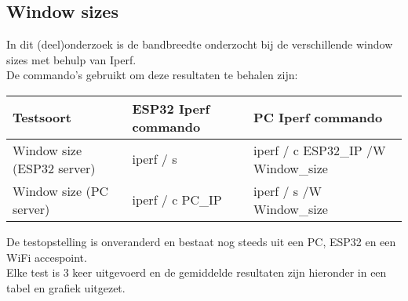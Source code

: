 \documentclass[../DCM2_Verslag.tex]{subfiles}
\begin{document}
 \clearpage
\subsection{Window sizes}
In dit (deel)onderzoek is de bandbreedte onderzocht bij de verschillende window sizes met behulp van Iperf. \\
De commando's gebruikt om deze resultaten te behalen zijn:\\
\begin{center}
\begin{tabular}{||l|l|l|}
   	 Testsoort & ESP32 Iperf commando & PC Iperf commando\\
   	 \hline \hline    
   	 Window size (ESP32 server) & iperf \-/ s & iperf \-/ c ESP32\_IP \-/W Window\_size\\
   	 Window size (PC server) & iperf \-/ c PC\_IP & iperf \-/ s \-/W Window\_size \\
   	 \hline
	\end{tabular}
\end{center}
De testopstelling is onveranderd en bestaat nog steeds uit een PC, ESP32 en een WiFi accespoint.\\
Elke test is 3 keer uitgevoerd en de gemiddelde resultaten zijn hieronder in een tabel en grafiek uitgezet.\\
\end{document}
